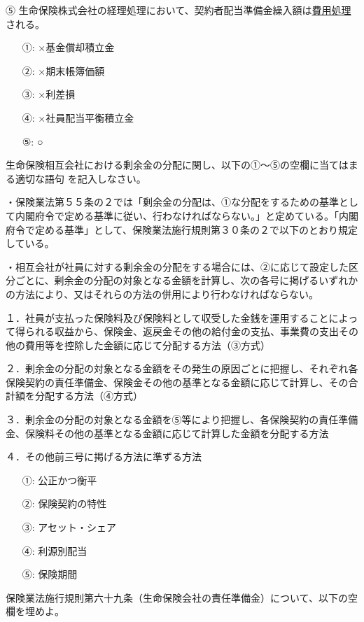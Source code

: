 \documentclass[report,gutter=10mm,fore-edge=10mm,uplatex,dvipdfmx]{jlreq}
\begin{document}
⑤ 生命保険株式会社の経理処理において、契約者配当準備金繰入額は\underline{費用処理}される。

\answer{}
\begin{itemize}
\item[ ①: ] ×基金償却積立金
\item[ ②: ] ×期末帳簿価額
\item[ ③: ] ×利差損
\item[ ④: ] ×社員配当平衡積立金
\item[ ⑤: ] ○
\end{itemize}


生命保険相互会社における剰余金の分配に関し、以下の①～⑤の空欄に当てはまる適切な語句
を記入しなさい。

・保険業法第５５条の２では「剰余金の分配は、①な分配をするための基準として内閣府令で定める基準に従い、行わなければならない。」と定めている。「内閣府令で定める基準」として、保険業法施行規則第３０条の２で以下のとおり規定している。

・相互会社が社員に対する剰余金の分配をする場合には、②に応じて設定した区分ごとに、剰余金の分配の対象となる金額を計算し、次の各号に掲げるいずれかの方法により、又はそれらの方法の併用により行わなければならない。

１．社員が支払った保険料及び保険料として収受した金銭を運用することによって得られる収益から、保険金、返戻金その他の給付金の支払、事業費の支出その他の費用等を控除した金額に応じて分配する方法（③方式）

２．剰余金の分配の対象となる金額をその発生の原因ごとに把握し、それぞれ各保険契約の責任準備金、保険金その他の基準となる金額に応じて計算し、その合計額を分配する方法（④方式）

３．剰余金の分配の対象となる金額を⑤等により把握し、各保険契約の責任準備金、保険料その他の基準となる金額に応じて計算した金額を分配する方法

４．その他前三号に掲げる方法に準ずる方法

\answer{}
\begin{itemize}
\item[ ①: ] 公正かつ衡平
\item[ ②: ] 保険契約の特性
\item[ ③: ] アセット・シェア
\item[ ④: ] 利源別配当
\item[ ⑤: ] 保険期間
\end{itemize}

保険業法施行規則第六十九条（生命保険会社の責任準備金）について、以下の空欄を埋めよ。
\end{document}
